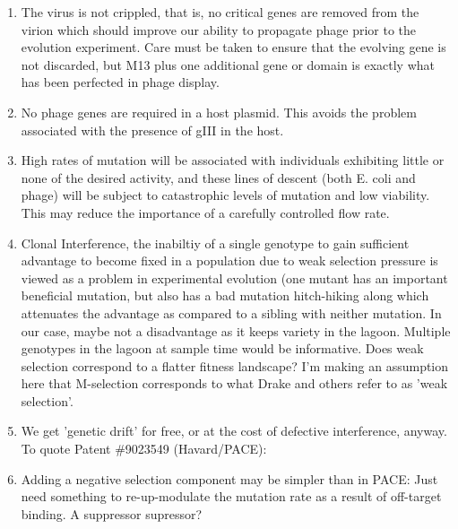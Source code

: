 \documentclass[10pt,letterpaper]{article}
\begin{document}
\begin{enumerate}
\item{The virus is not crippled, that is, no critical genes are removed from the virion which should improve our ability to propagate phage prior to the evolution experiment.  Care must be taken to ensure that the evolving gene is not discarded, but M13 plus one additional gene or domain is exactly what has been perfected in phage display.}
\item{No phage genes are required in a host plasmid.  This avoids the problem associated with the presence of gIII in the host.}
\item{High rates of mutation will be associated with individuals exhibiting little or none of the desired activity, and these lines of descent (both E. coli and phage) will be subject to catastrophic levels of mutation and low viability. This may reduce the importance of a carefully controlled flow rate.}
\item{Clonal Interference\cite{dynamics}, the inabiltiy of a single genotype to gain sufficient advantage to become fixed in a population due to weak selection pressure is viewed as a problem in experimental evolution (one mutant has an important beneficial mutation, but also has a bad mutation hitch-hiking along which attenuates the advantage as compared to a sibling with neither mutation. In our case, maybe not a disadvantage as it keeps variety in the lagoon. Multiple genotypes in the lagoon at sample time would be informative. Does weak selection correspond to a flatter fitness landscape? I'm making an assumption here that M-selection corresponds to what Drake and others refer to as 'weak selection'.}

\item{We get 'genetic drift' for free, or at the cost of defective interference, anyway. To quote Patent \#9023549 (Havard/PACE):
}

\item{Adding a negative selection component may be simpler than in PACE: Just need something to re-up-modulate the mutation rate as a result of off-target binding. A suppressor supressor?}

\end{enumerate}
\end{document}
